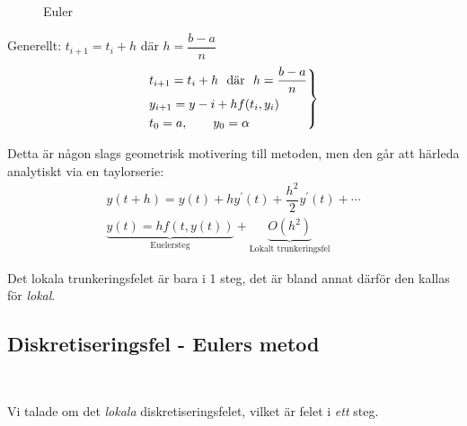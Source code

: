 \begin{figure}[ht]
    \centering
    \caption{Euler}
    \label{fig:euler}
\end{figure}
\par\bigskip
\noindent Generellt: $t_{i+1}=t_i+h$ där $h=\dfrac{b-a}{n}$
\begin{equation*}
  \begin{gathered}
    \begin{rcases*}
      t_{i+1}=t_i+h$ \text{ där } $h=\dfrac{b-a}{n}\\
      y_{i+1}=y-i + hf(t_i,y_i)\\
      t_0=a,\qquad y_0 = \alpha
    \end{rcases*}
  \end{gathered}
\end{equation*}\par
\noindent Detta är någon slags geometrisk motivering till metoden, men den går att härleda analytiskt via en taylorserie:
\begin{equation*}
  \begin{gathered}
    y(t+h)=y(t)+hy^{\prime}(t)+\dfrac{h^2}{2}y^{\prime}(t)+\cdots\\
    \underbrace{y(t)=hf(t,y(t))}_{\text{Euelersteg}}+\underbrace{O(h^2)}_{\text{Lokalt trunkeringsfel}}
  \end{gathered}
\end{equation*}\par
\noindent Det lokala trunkeringsfelet är bara i 1 steg, det är bland annat därför den kallas för \textit{lokal}.
\par\bigskip
\subsection{Diskretiseringsfel - Eulers metod}\hfill\\
\par\bigskip
\noindent Vi talade om det \textit{lokala} diskretiseringsfelet, vilket är felet i \textit{ett} steg. 
